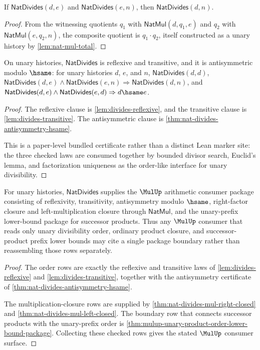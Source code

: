 \begin{lemma}
\label{lem:divides-transitive}
If \(\mathsf{NatDivides}(d, e)\) and \(\mathsf{NatDivides}(e, n)\), then \(\mathsf{NatDivides}(d, n)\).
\end{lemma}
\begin{proof}
From the witnessing quotients \(q_1\) with \(\mathsf{NatMul}(d, q_1, e)\) and \(q_2\) with \(\mathsf{NatMul}(e, q_2, n)\), the composite quotient is \(q_1 \cdot q_2\), itself constructed as a unary history by \autoref{lem:nat-mul-total}.
\end{proof}

\begin{theorem}
\label{thm:nat-divides-partial-order-certificate}
On unary histories, $\mathsf{NatDivides}$ is reflexive and transitive, and it is
antisymmetric modulo $\hsame$: for unary histories $d$, $e$, and $n$,
$\mathsf{NatDivides}(d,d)$,
$\mathsf{NatDivides}(d,e) \wedge \mathsf{NatDivides}(e,n) \Rightarrow
\mathsf{NatDivides}(d,n)$, and
$\mathsf{NatDivides}(d,e) \wedge \mathsf{NatDivides}(e,d) \Rightarrow
d\hsame e$.
\end{theorem}
\begin{proof}
The reflexive clause is \autoref{lem:divides-reflexive}, and the transitive
clause is \autoref{lem:divides-transitive}. The antisymmetric clause is
\autoref{thm:nat-divides-antisymmetry-hsame}.

This is a paper-level bundled certificate rather than a distinct Lean marker
site: the three checked laws are consumed together by bounded divisor search,
Euclid's lemma, and factorization uniqueness as the order-like interface for
unary divisibility.
\end{proof}

\begin{theorem}
\label{thm:mulup-divisibility-order-consumer-package}
For unary histories, $\mathsf{NatDivides}$ supplies the $\MulUp$ arithmetic
consumer package consisting of reflexivity, transitivity, antisymmetry modulo
$\hsame$, right-factor closure and left-multiplication closure through
$\mathsf{NatMul}$, and the unary-prefix lower-bound package for successor
products. Thus any $\MulUp$ consumer that reads only unary divisibility order,
ordinary product closure, and successor-product prefix lower bounds may cite a
single package boundary rather than reassembling those rows separately.
\end{theorem}
\begin{proof}
The order rows are exactly the reflexive and transitive laws of
\autoref{lem:divides-reflexive} and \autoref{lem:divides-transitive}, together
with the antisymmetry certificate of
\autoref{thm:nat-divides-antisymmetry-hsame}.

The multiplication-closure rows are supplied by
\autoref{thm:nat-divides-mul-right-closed} and
\autoref{thm:nat-divides-mul-left-closed}. The boundary row that connects
successor products with the unary-prefix order is
\autoref{thm:mulup-unary-product-order-lower-bound-package}. Collecting these
checked rows gives the stated $\MulUp$ consumer surface.
\end{proof}
